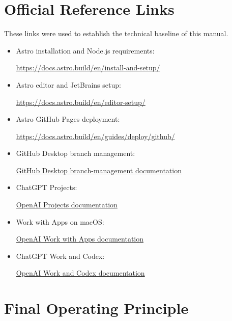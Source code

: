 \documentclass[11pt,letterpaper]{article}
\begin{document}
\section{Official Reference Links}

These links were used to establish the technical baseline of this
manual.

\begin{itemize}
    \item Astro installation and Node.js requirements:

    \href{https://docs.astro.build/en/install-and-setup/}
    {https://docs.astro.build/en/install-and-setup/}

    \item Astro editor and JetBrains setup:

    \href{https://docs.astro.build/en/editor-setup/}
    {https://docs.astro.build/en/editor-setup/}

    \item Astro GitHub Pages deployment:

    \href{https://docs.astro.build/en/guides/deploy/github/}
    {https://docs.astro.build/en/guides/deploy/github/}

    \item GitHub Desktop branch management:

    \href{https://docs.github.com/en/desktop/making-changes-in-a-branch/managing-branches-in-github-desktop}
    {GitHub Desktop branch-management documentation}

    \item ChatGPT Projects:

    \href{https://help.openai.com/en/articles/10169521-projects-in-chatgpt}
    {OpenAI Projects documentation}

    \item Work with Apps on macOS:

    \href{https://help.openai.com/en/articles/10119604-work-with-apps-on-macos}
    {OpenAI Work with Apps documentation}

    \item ChatGPT Work and Codex:

    \href{https://help.openai.com/en/articles/20001275-chatgpt-work-and-codex}
    {OpenAI Work and Codex documentation}
\end{itemize}

\section*{Final Operating Principle}
\end{document}
